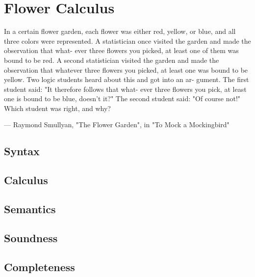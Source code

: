 \setchapterpreamble[u]{\margintoc}
\chapter{Flower Calculus}


In a certain flower garden, each flower was either red, yellow,
or blue, and all three colors were represented. A statistician
once visited the garden and made the observation that what-
ever three flowers you picked, at least one of them was bound
to be red. A second statistician visited the garden and made
the observation that whatever three flowers you picked, at
least one was bound to be yellow.
Two logic students heard about this and got into an ar-
gument. The first student said: "It therefore follows that what-
ever three flowers you pick, at least one is bound to be blue,
doesn't it?" The second student said: "Of course not!"
Which student was right, and why?

--- Raymond Smullyan, "The Flower Garden", in "To Mock a Mockingbird"

\section{Syntax}

\section{Calculus}

\section{Semantics}

\section{Soundness}

\section{Completeness}